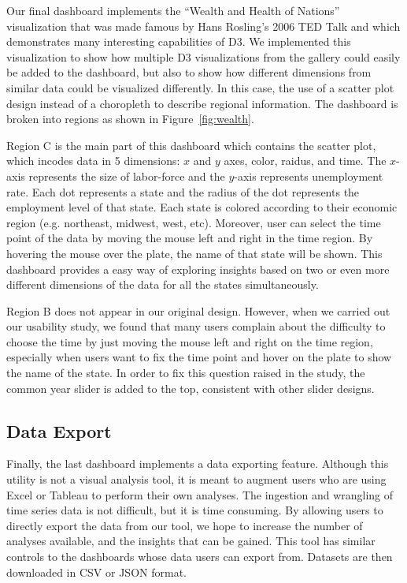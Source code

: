 \documentclass{sigchi}
\begin{document}
{Our final dashboard implements the ``Wealth and Health of Nations'' visualization that was made famous by Hans Rosling's 2006 TED Talk \cite{_wealth_????} and which demonstrates many interesting capabilities of D3. We implemented this visualization to show how multiple D3 visualizations from the gallery could easily be added to the dashboard, but also to show how different dimensions from similar data could be visualized differently. In this case, the use of a scatter plot design instead of a choropleth to describe regional information. The dashboard is broken into regions as shown in Figure~\ref{fig:wealth}.

Region C is the main part of this dashboard which contains the scatter plot, which incodes data in 5 dimensions: $x$ and $y$ axes, color, raidus, and time. The $x$-axis represents the size of labor-force and the $y$-axis represents unemployment rate. Each dot represents a state and the radius of the dot represents the employment level of that state. Each state is colored according to their economic region (e.g. northeast, midwest, west, etc). Moreover, user can select the time point of the data by moving the mouse left and right in the time region. By hovering the mouse over the plate, the name of that state will be shown. This dashboard provides a easy way of exploring insights based on two or even more different dimensions of the data for all the states simultaneously.

Region B does not appear in our original design. However, when we carried out our usability study, we found that many users complain about the difficulty to choose the time by just moving the mouse left and right on the time region, especially when users want to fix the time point and hover on the plate to show the name of the state. In order to fix this question raised in the study, the common year slider is added to the top, consistent with other slider designs.

\subsection{Data Export}

Finally, the last dashboard implements a data exporting feature. Although this utility is not a visual analysis tool, it is meant to augment users who are using Excel or Tableau to perform their own analyses. The ingestion and wrangling of time series data is not difficult, but it is time consuming. By allowing users to directly export the data from our tool, we hope to increase the number of analyses available, and the insights that can be gained. This tool has similar controls to the dashboards whose data users can export from. Datasets are then downloaded in CSV or JSON format.

}
\end{document}
